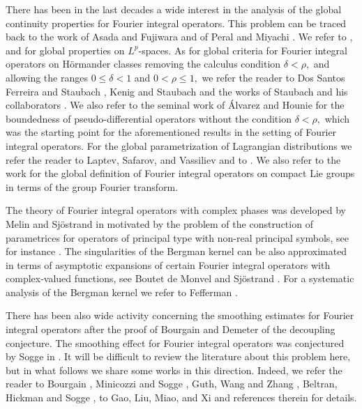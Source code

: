 \documentclass[12pt, reqno]{amsart}
\theoremstyle{definition}
\theoremstyle{remark}
\numberwithin{equation}{section}
\begin{document}
There has been in the last decades a wide interest in the analysis of the global continuity properties for Fourier integral operators. This problem can be traced back to the work of Asada and  Fujiwara \cite{Asada1978} and of Peral \cite{Peral1980} and Miyachi \cite{Miyachi1980}. We refer to \cite{Ruzhansky2006}, \cite{Ruzhansky:Sugimoto} and \cite{Coriasco:Ruzhansky,Coriasco:Toft2016} for global properties on $L^p$-spaces. As for global criteria for Fourier integral operators on H\"ormander classes removing the calculus condition $\delta<\rho,$ and allowing the ranges $0\leq \delta<1$ and $0< \rho\leq 1,$ we refer the reader to Dos Santos Ferreira and Staubach \cite{Dos:Santos2014},  Kenig and Staubach \cite{KenigStaubach} and the works of Staubach and his collaborators \cite{Staubach2021,Staubach,Rodriguez:Lopez2015,Rodriguez:Lopez}. We also refer to the seminal work of \'Alvarez and Hounie \cite{Hounie} for the boundedness of pseudo-differential operators without the condition $\delta<\rho,$ which was the starting point for the aforementioned results in the setting of Fourier integral operators. For the global parametrization of Lagrangian distributions we refer the reader to Laptev, Safarov, and Vassiliev \cite{Laptev:Safarov:Vassiliev} and to \cite{Ruzhansky:CWI-book}. We also refer to the work \cite{CardonaRuzhansky:MSJ:Japan} for the global definition of Fourier integral operators on compact Lie groups in terms of the group Fourier transform.

The theory of Fourier integral operators with complex phases was developed by  Melin and Sj\"ostrand in \cite{Melin:Sjostrand1975} motivated by the problem of the construction of parametrices for operators of principal type with non-real principal symbols, see for instance \cite{Melin:Sjostrand1976}. The singularities of the Bergman kernel can be also approximated in terms of asymptotic expansions of certain Fourier integral operators with complex-valued functions, see Boutet de Monvel and Sj\"ostrand \cite{Boutet:de:Monvel82}. For a systematic analysis of the Bergman kernel we refer to Fefferman \cite{Fefferman1974,Fefferman1976}.

There has been also wide activity concerning the smoothing estimates for Fourier integral operators after the proof of Bourgain and Demeter \cite{Bourgain:Demeter:2015} of the decoupling conjecture. The smoothing effect for Fourier integral operators was conjectured by Sogge in \cite{Sogge1991}. It will be difficult to review the literature about this problem here, but in what follows we share some works in this direction. Indeed, we refer the reader to Bourgain \cite{Bourgain1991}, Minicozzi and Sogge \cite{Minicozzi:Sogge}, Guth, Wang and Zhang \cite{GuthWangZhang}, Beltran, Hickman and Sogge \cite{BeltranHickmanSogge}, to Gao, Liu, Miao, and Xi \cite{GaoLiuMiaoXi2023} and references therein for details.
\\
\end{document}
